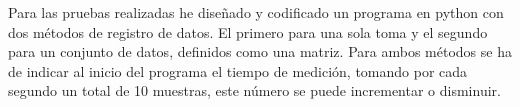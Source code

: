 
Para las pruebas realizadas he diseñado y codificado un programa en python con dos métodos de registro de datos. El primero para una sola toma y el segundo para un conjunto de datos, definidos como una matriz. Para ambos métodos se ha de indicar al inicio del programa el tiempo de medición, tomando por cada segundo un total de 10 muestras, este número se puede incrementar o disminuir.


